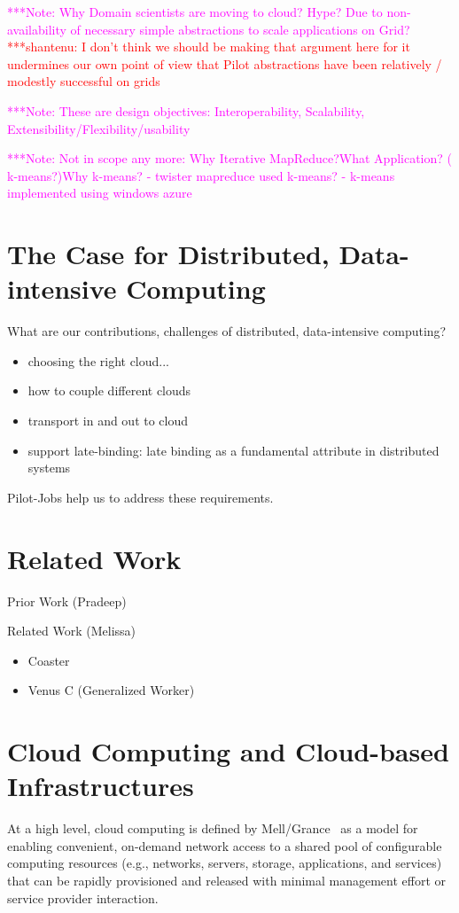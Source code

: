 \documentclass[times]{cpeauth}
\newcommand{\jhanote}[1]{ {\textcolor{red} { ***shantenu: #1 }}}
\newcommand{\note}[1]{ {\textcolor{magenta} { ***Note: #1 }}}
\newcommand{\jhanote}[1]{}
\newcommand{\note}[1]{}
\begin{document}
\note{Why Domain scientists are moving to cloud? Hype? Due to
  non-availability of necessary simple abstractions to scale
  applications on Grid?} \jhanote{I don't think we should be making
    that argument here for it undermines our own point of view that
    Pilot abstractions have been relatively / modestly successful on
    grids}

\note{These are design objectives: Interoperability, Scalability,
  Extensibility/Flexibility/usability}

\note{Not in scope any more: Why Iterative MapReduce?What
  Application?  ( k-means?)Why k-means?  - twister mapreduce used
  k-means?  - k-means implemented using windows azure}


\section{The Case for Distributed, Data-intensive Computing}

What are our contributions, challenges of distributed, data-intensive computing?
\begin{itemize}
	\item choosing the right cloud... 
	\item how to couple different clouds
	\item transport in and out to cloud
	\item support late-binding: late binding as a fundamental attribute in 
	distributed systems
\end{itemize}
Pilot-Jobs help us to address these requirements.

\section{Related Work}

Prior Work (Pradeep)

Related Work (Melissa)

\begin{itemize}
	\item Coaster
	\item Venus C (Generalized Worker)
\end{itemize}


\section{Cloud Computing and Cloud-based Infrastructures}

At a high level, cloud computing is defined by Mell/Grance~\cite{nist_cloud}
as a model for enabling convenient, on-demand network access to a shared pool
of configurable computing resources (e.g., networks, servers, storage,
applications, and services) that can be rapidly provisioned and released with
minimal management effort or service provider interaction.
\end{document}
